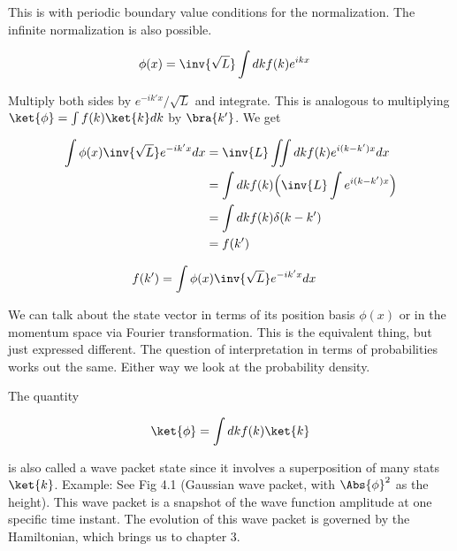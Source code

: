 This is with periodic boundary value conditions for the normalization.  The infinite normalization is also possible.

\begin{equation}\label{eqn:lecture5BigReviewCh2Operators:120}
\begin{aligned}
\phi(x)
&= \inv{\sqrt{L}} \int dk f(k) e^{ikx}
\end{aligned}
\end{equation}

Multiply both sides by $e^{-ik'x}/\sqrt{L}$ and integrate.  This is analogous to multiplying $\ket{\phi} = \int f(k) \ket{k} dk$ by $\bra{k'}$.  We get

\begin{equation}\label{eqn:lecture5BigReviewCh2Operators:140}
\begin{aligned}
\int \phi(x) \inv{\sqrt{L}} e^{-ik'x} dx
&= \inv{L} \iint dk f(k) e^{i(k-k')x} dx \\
&= \int dk f(k) \Bigl( \inv{L} \int e^{i(k-k')x} \Bigr) \\
&= \int dk f(k) \delta(k-k') \\
&= f(k')
\end{aligned}
\end{equation}

\begin{equation}\label{eqn:lecture5BigReviewCh2Operators:160}
\begin{aligned}
f(k') &=
\int \phi(x) \inv{\sqrt{L}} e^{-ik'x} dx
\end{aligned}
\end{equation}

We can talk about the state vector in terms of its position basis $\phi(x)$ or in the momentum space via Fourier transformation.  This is the equivalent thing, but just expressed different.  The question of interpretation in terms of probabilities works out the same.  Either way we look at the probability density.

The quantity

\begin{equation}\label{eqn:lecture5BigReviewCh2Operators:180}
\begin{aligned}
\ket{\phi} = \int dk f(k) \ket{k}
\end{aligned}
\end{equation}

is also called a wave packet state since it involves a superposition of many stats $\ket{k}$.  Example: See Fig 4.1 (Gaussian wave packet, with $\Abs{\phi}^2$ as the height).  This wave packet is a snapshot of the wave function amplitude at one specific time instant.  The evolution of this wave packet is governed by the Hamiltonian, which brings us to chapter 3.

